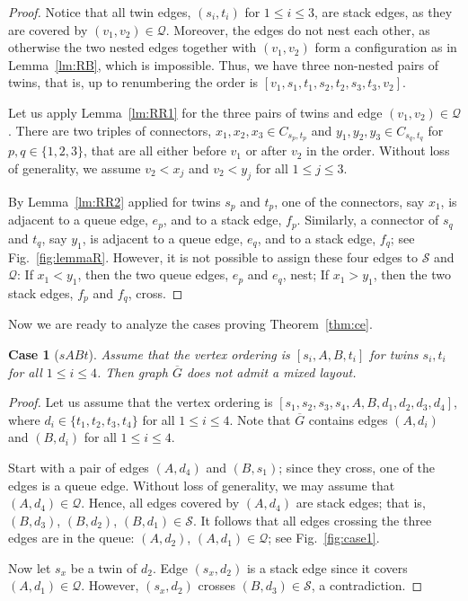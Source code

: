 \documentclass[orivec]{llncs}
\newcommand{\Sh}{{\ensuremath{\mathcal{S}}}}
\newcommand{\Qh}{{\ensuremath{\mathcal{Q}}}}
\newcommand{\Gc}{{\ensuremath{\overline{G}}}}
\newtheorem{cs}{Case}
\begin{document}
\begin{proof}
    Notice that all twin edges, $(s_i, t_i)$ for $1 \le i \le 3$, are stack edges, as they are covered by $(v_1, v_2) \in \Qh$.
    Moreover, the edges do not nest each other, as otherwise the two nested edges together with $(v_1, v_2)$ form
    a configuration as in Lemma~\ref{lm:RB}, which is impossible.
    Thus, we have three non-nested pairs of twins, that is, up to renumbering
    the order is $[v_1, s_1, t_1, s_2, t_2, s_3, t_3, v_2]$.
    
    Let us apply Lemma~\ref{lm:RR1} for the three pairs of twins and edge $(v_1, v_2) \in \Qh$. There are
    two triples of connectors, $x_1, x_2, x_3 \in C_{s_p,t_p}$ and $y_1, y_2, y_3 \in C_{s_q,t_q}$ for $p, q \in \{1,2,3\}$,
    that are all either before $v_1$ or after $v_2$ in the order. Without loss of generality, we assume
    $v_2 < x_j$ and $v_2 < y_j$ for all $1\le j \le 3$.
    
    By Lemma~\ref{lm:RR2} applied for twins $s_p$ and $t_p$, one of the connectors, say $x_1$, is adjacent to 
    a queue edge, $e_p$,  and to a stack edge, $f_p$. Similarly, a connector of $s_q$ and $t_q$, say $y_1$, is adjacent to 
    a queue edge, $e_q$, and to a stack edge, $f_q$; see Fig.~\ref{fig:lemmaR}.
    However, it is not possible to assign these four edges to $\Sh$ and $\Qh$:
    If $x_1 < y_1$, then the two queue edges, $e_p$ and $e_q$, nest; 
    If $x_1 > y_1$, then the two stack edges, $f_p$ and $f_q$, cross.
\end{proof}



Now we are ready to analyze the cases proving Theorem~\ref{thm:ce}.

\begin{cs}[$sABt$]
    \label{cs:1}
    Assume that the vertex ordering is $[s_i, A, B, t_i]$ for twins $s_i, t_i$ for all $1 \le i \le 4$.
    Then graph $\Gc$ does not admit a mixed layout.
\end{cs}    

\begin{proof}
    Let us assume that the vertex ordering is $[s_1, s_2, s_3, s_4, A, B, d_1, d_2, d_3, d_4]$, where 
    $d_i \in \{t_1, t_2, t_3, t_4\}$ for all $1 \le i \le 4$.
    Note that $\Gc$ contains edges $(A, d_i)$ and $(B, d_i)$ for all $1 \le i \le 4$.
    
    Start with a pair of edges $(A, d_4)$ and $(B, s_1)$; since they cross, one of the edges is a queue edge. Without
    loss of generality, we may assume
    that $(A, d_4) \in \Qh$. Hence, all edges covered by $(A, d_4)$ are stack edges; that is, 
    $(B, d_3)$, $(B, d_2)$, $(B, d_1) \in \Sh$. It follows that all edges crossing the three edges are in 
    the queue: $(A, d_2)$, $(A, d_1) \in \Qh$; see Fig.~\ref{fig:case1}.
    
    Now let $s_x$ be a twin of $d_2$. Edge $(s_x, d_2)$ is a stack edge since it covers $(A, d_1) \in \Qh$. However,
    $(s_x, d_2)$ crosses $(B, d_3) \in \Sh$, a contradiction.
\end{proof}    
\end{document}

